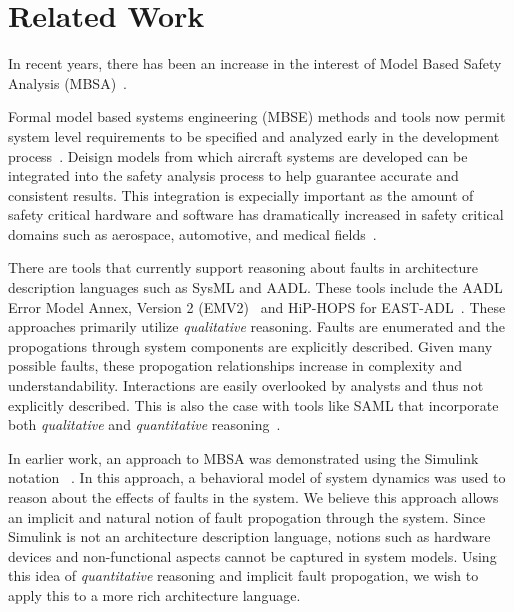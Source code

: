 \section{Related Work}
\label{sec:related_work}

In recent years, there has been an increase in the interest of Model Based Safety Analysis (MBSA)~\cite{Bozzano:2010:DSA:1951720}. 

Formal model based systems engineering (MBSE) methods and tools now permit system level requirements to be specified and analyzed early in the development process~\cite{QFCS15:backes,CIMATTI2015333, NFM2012:CoGaMiWhLaLu, hilt2013:MuWhRaHe, Pajic2012}. Deisign models from which aircraft systems are developed can be integrated into the safety analysis process to help guarantee accurate and consistent results. This integration is expecially important as the amount of safety critical hardware and software has dramatically increased in safety critical domains such as aerospace, automotive, and medical fields~\cite{Stewart17:IMBSA}.

There are tools that currently support reasoning about faults in architecture description languages such as SysML and AADL. These tools include the AADL Error Model Annex, Version 2 (EMV2)~\cite{EMV2} and HiP-HOPS for EAST-ADL~\cite{CHEN201391}. These approaches primarily utilize \textit{qualitative} reasoning. Faults are enumerated and the propogations through system components are explicitly described. Given many possible faults, these propogation relationships increase in complexity and understandability. Interactions are easily overlooked by analysts and thus not explicitly described. This is also the case with tools like SAML that incorporate both \textit{qualitative} and \textit{quantitative} reasoning~\cite{Gudemann:2010:FQQ:1909626.1909813}. 

In earlier work, an approach to MBSA was demonstrated using the Simulink notation~\cite{Joshi05:SafeComp,Joshi05:Dasc,NasaRep:MBSA-Aug05, MathWorks} . In this approach, a behavioral model of system dynamics was used to reason about the effects of faults in the system. We believe this approach allows an implicit and natural notion of fault propogation through the system. Since Simulink is not an architecture description language, notions such as hardware devices and non-functional aspects cannot be captured in system models. Using this idea of \textit{quantitative} reasoning and implicit fault propogation, we wish to apply this to a more rich architecture language. 


